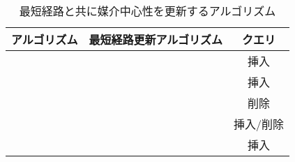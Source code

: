 \begin{table}[tb]
  \label{tab:comparizon-of-algorithms}
  \centering
  \caption{最短経路と共に媒介中心性を更新するアルゴリズム}
  \begin{tabular}{ccc}
    \hline
    アルゴリズム & 最短経路更新アルゴリズム & クエリ \\ \hline
    \cite{Kas2013} & \cite{Ramalingam1996} & 挿入 \\ \hline
    \cite{Nasre2014a} & \cite{Karger1993} & 挿入 \\ \hline
    \cite{Nasre2014b} & \cite{Demetrescu2003} & 削除 \\ \hline
    \cite{Pontecorvi2015} & \cite{Demetrescu2003} & 挿入/削除 \\ \hline
    \cite{Bergamini2017} & \cite{Ramalingam1996} & 挿入 \\ \hline
  \end{tabular}
\end{table}

